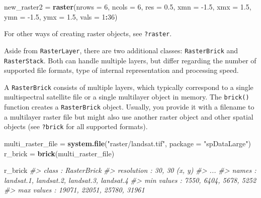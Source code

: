 \documentclass[]{krantz}
\newenvironment{Shaded}{\begin{snugshade}}{\end{snugshade}}
\newcommand{\CommentTok}[1]{\textcolor[rgb]{0.37,0.37,0.37}{\textit{#1}}}
\newcommand{\DataTypeTok}[1]{\textcolor[rgb]{0.27,0.27,0.27}{#1}}
\newcommand{\DecValTok}[1]{\textcolor[rgb]{0.06,0.06,0.06}{#1}}
\newcommand{\FloatTok}[1]{\textcolor[rgb]{0.06,0.06,0.06}{#1}}
\newcommand{\KeywordTok}[1]{\textcolor[rgb]{0.27,0.27,0.27}{\textbf{#1}}}
\newcommand{\NormalTok}[1]{#1}
\newcommand{\OperatorTok}[1]{\textcolor[rgb]{0.43,0.43,0.43}{\textbf{#1}}}
\newcommand{\StringTok}[1]{\textcolor[rgb]{0.5,0.5,0.5}{#1}}
\begin{document}
\begin{Shaded}
\begin{Highlighting}[]
\NormalTok{new_raster2 =}\StringTok{ }\KeywordTok{raster}\NormalTok{(}\DataTypeTok{nrows =} \DecValTok{6}\NormalTok{, }\DataTypeTok{ncols =} \DecValTok{6}\NormalTok{, }\DataTypeTok{res =} \FloatTok{0.5}\NormalTok{, }
                     \DataTypeTok{xmn =} \FloatTok{-1.5}\NormalTok{, }\DataTypeTok{xmx =} \FloatTok{1.5}\NormalTok{, }\DataTypeTok{ymn =} \FloatTok{-1.5}\NormalTok{, }\DataTypeTok{ymx =} \FloatTok{1.5}\NormalTok{,}
                     \DataTypeTok{vals =} \DecValTok{1}\OperatorTok{:}\DecValTok{36}\NormalTok{)}
\end{Highlighting}
\end{Shaded}

For other ways of creating raster objects, see \texttt{?raster}.

Aside from \texttt{RasterLayer}, there are two additional classes: \texttt{RasterBrick} and \texttt{RasterStack}.
Both can handle multiple layers, but differ regarding the number of supported file formats, type of internal representation and processing speed.

A \texttt{RasterBrick} consists of multiple layers, which typically correspond to a single multispectral satellite file or a single multilayer object in memory.
The \texttt{brick()} function creates a \texttt{RasterBrick} object.
Usually, you provide it with a filename to a multilayer raster file but might also use another raster object and other spatial objects (see \texttt{?brick} for all supported formats).

\begin{Shaded}
\begin{Highlighting}[]
\NormalTok{multi_raster_file =}\StringTok{ }\KeywordTok{system.file}\NormalTok{(}\StringTok{"raster/landsat.tif"}\NormalTok{, }\DataTypeTok{package =} \StringTok{"spDataLarge"}\NormalTok{)}
\NormalTok{r_brick =}\StringTok{ }\KeywordTok{brick}\NormalTok{(multi_raster_file)}
\end{Highlighting}
\end{Shaded}

\begin{Shaded}
\begin{Highlighting}[]
\NormalTok{r_brick}
\CommentTok{#> class       : RasterBrick }
\CommentTok{#> resolution  : 30, 30  (x, y)}
\CommentTok{#> ...}
\CommentTok{#> names       : landsat.1, landsat.2, landsat.3, landsat.4 }
\CommentTok{#> min values  :      7550,      6404,      5678,      5252 }
\CommentTok{#> max values  :     19071,     22051,     25780,     31961}
\end{Highlighting}
\end{Shaded}
\end{document}
